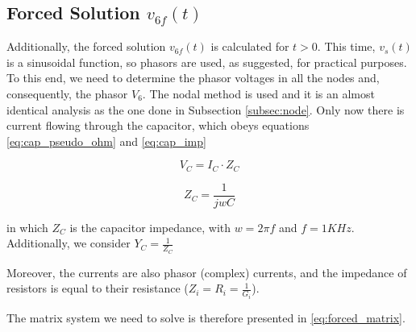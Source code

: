\subsection{Forced Solution $v_{6f}(t)$}
\label{subsec:Forced_Sol_theory}

Additionally, the forced solution $v_{6f}(t)$ is calculated for $t>0$. This time, $v_s(t)$ is a sinusoidal function, so phasors are used, as suggested, for practical purposes. To this end, we need to determine the phasor voltages in all the nodes and, consequently, the phasor $V_6$. The nodal method is used and it is an almost identical analysis as the one done in Subsection \ref{subsec:node}. Only now there is current flowing through the capacitor, which obeys equations \ref{eq:cap_pseudo_ohm} and \ref{eq:cap_imp}

\begin{equation}
  V_C = I_C \cdot Z_C
  \label{eq:cap_pseudo_ohm}
\end{equation}

\begin{equation}
  Z_C = \frac{1}{jwC}
  \label{eq:cap_imp}
\end{equation}

in which $Z_C$ is the capacitor impedance, with $w = 2\pi f$ and $f=1 KHz$. Additionally, we consider $Y_C = \frac{1}{Z_C}$


Moreover, the currents are also phasor (complex) currents, and the impedance of resistors is equal to their resistance ($Z_i = R_i = \frac{1}{G_i}$).

The matrix system we need to solve is therefore presented in \ref{eq:forced_matrix}.

